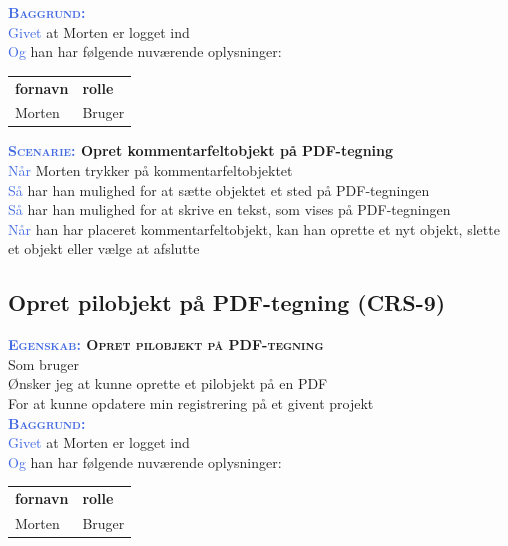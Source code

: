 \textsc{\textcolor{RoyalBlue}{\textbf{Baggrund:}}}\\
\textcolor{RoyalBlue}{Givet} at Morten er logget ind\\
\textcolor{RoyalBlue}{Og} han har følgende nuværende oplysninger:\\
\begin{tabular}{| l | l |}
	\textbf{fornavn} & \textbf{rolle} \\
	Morten & Bruger\\
\end{tabular}

\clearpage

\textbf{\textsc{\textcolor{RoyalBlue}{Scenarie:}} Opret kommentarfeltobjekt på PDF-tegning}\\
\textcolor{RoyalBlue}{Når} Morten trykker på kommentarfeltobjektet\\
\textcolor{RoyalBlue}{Så}  har han mulighed for at sætte objektet et sted på PDF-tegningen\\
\textcolor{RoyalBlue}{Så}  har han mulighed for at skrive en tekst, som vises på PDF-tegningen\\
\textcolor{RoyalBlue}{Når} han har placeret kommentarfeltobjekt, kan han oprette et nyt objekt, slette et objekt eller vælge at afslutte \\

\subsection{Opret pilobjekt på PDF-tegning (CRS-9)} \label{sec:USOpretPilObjekt}
\textbf{\textsc{\textcolor{RoyalBlue}{Egenskab:} Opret pilobjekt på PDF-tegning}}\\
Som bruger\\
Ønsker jeg at kunne oprette et pilobjekt på en PDF\\
For at kunne opdatere min registrering på et givent projekt \\

\textsc{\textcolor{RoyalBlue}{\textbf{Baggrund:}}}\\
\textcolor{RoyalBlue}{Givet} at Morten er logget ind\\
\textcolor{RoyalBlue}{Og} han har følgende nuværende oplysninger:\\
\begin{tabular}{| l | l |}
	\textbf{fornavn} & \textbf{rolle} \\
	Morten & Bruger\\
\end{tabular}


